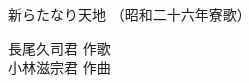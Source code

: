 \documentclass[10pt,b5j]{tarticle} %
\begin{document}
\begin{minipage}[c]{0.7\hsize} %
    \begin{center}
        {\LARGE
            新らたなり天地 %
        }
        {\small 
            （昭和二十六年寮歌） %
        }
    \end{center}
\end{minipage}
\begin{minipage}[c]{0.3\hsize} %
    \begin{flushright} %
        長尾久司君 作歌\\小林滋宗君 作曲 %
    \end{flushright}
\end{minipage}
\end{document}
